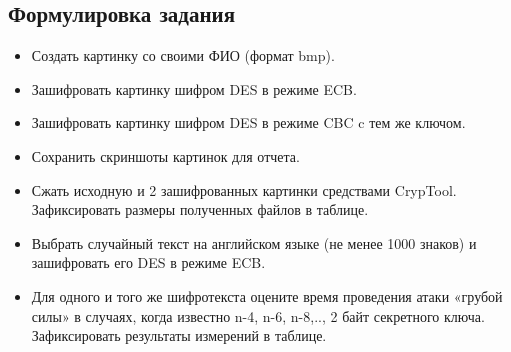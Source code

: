 \documentclass[a4paper, 14pt]{extarticle}
\begin{document}
\subsection{Формулировка задания}
\begin{itemize}
    \item Создать картинку со своими ФИО (формат bmp).
    \item Зашифровать картинку шифром DES в режиме ECB.\@
    \item Зашифровать картинку шифром DES в режиме CBC c тем же ключом.
    \item Сохранить скриншоты картинок для отчета.
    \item Сжать исходную и 2 зашифрованных картинки средствами CrypTool. Зафиксировать размеры полученных файлов в таблице.
    \item Выбрать случайный текст на английском языке (не менее 1000 знаков) и зашифровать его DES в режиме ECB.\@
    \item Для одного и того же шифротекста оцените время проведения атаки «грубой силы» в случаях, когда известно n-4, n-6, n-8,.., 2 байт секретного ключа. Зафиксировать результаты измерений в таблице.
\end{itemize}
\end{document}
